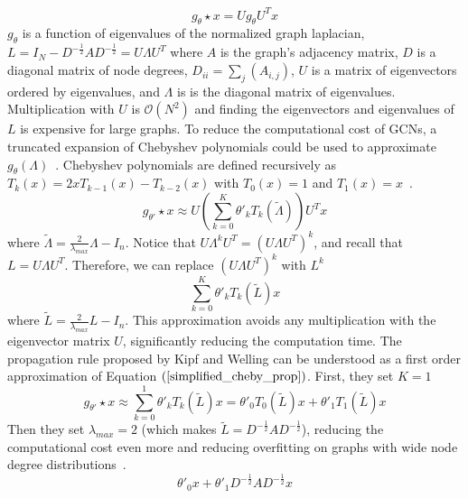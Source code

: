 \begin{equation}
\label{spectral_prop}
g_\theta \star x = Ug_\theta U^Tx
\end{equation}
$g_\theta$ is a function of eigenvalues of the normalized graph laplacian, $L = I_N - D^{-\frac{1}{2}}AD^{-\frac{1}{2}} = U\Lambda U^T$ where $A$ is the graph's adjacency matrix, $D$ is a diagonal matrix of node degrees, $D_{ii} = \sum_{j} (A_{i,j})$, $U$ is a matrix of eigenvectors ordered by eigenvalues, and $\Lambda$ is is the diagonal matrix of eigenvalues. Multiplication with $U$ is $\mathcal{O}(N^2) $ and finding the eigenvectors and eigenvalues of $L$ is expensive for large graphs. To reduce
 the computational cost of GCNs, a truncated expansion of Chebyshev polynomials could be used to approximate $g_\theta (\Lambda)$~\cite{Defferrard2016}.
Chebyshev polynomials are defined recursively as $T_k(x) = 2xT_{k-1}(x) - T_{k-2}(x)$ with $T_0(x) = 1$ and $T_1(x) = x$~\cite{Hammond2011}.
\begin{equation}
\label{cheby_prop}
g_{\theta'} \star x \approx U(\sum\limits_{k=0}^{K}\theta'_k T_k (\tilde{\Lambda}))U^Tx
\end{equation}
where $\tilde{\Lambda} = \frac{2}{\lambda_{max}} \Lambda - I_n$. Notice that $U \Lambda^k U^T = (U \Lambda U^T)^k$, and recall that $L = U\Lambda U^T$. Therefore, we can replace $(U \Lambda U^T)^k$ with $L^k$
\begin{equation}
\label{simplified_cheby_prop}
\sum\limits_{k=0}^{K} \theta'_k T_k (\tilde{L})x
\end{equation}
where  $\tilde{L} = \frac{2}{\lambda_{max}} L - I_n$. This approximation avoids any multiplication with the eigenvector matrix $U$, significantly reducing the computation time. The propagation rule proposed by Kipf and Welling can be understood as a first order approximation of Equation $(\ref{simplified_cheby_prop})$. First, they set $K = 1$
\begin{equation}
\label{firstorder_cheby}
g_{\theta'} \star x \approx \sum\limits_{k=0}^{1} \theta'_k T_k (\tilde{L})x = \theta'_0 T_0 (\tilde{L})x + \theta'_1 T_1 (\tilde{L})x
\end{equation}
Then they set $\lambda_{max} = 2$ (which makes $\tilde{L} = D^{-\frac{1}{2}}AD^{-\frac{1}{2}}$), reducing the computational cost even more and reducing overfitting on graphs with wide node degree distributions~\cite{Kipf2016}.
\begin{equation}
\label{two_params}
\theta'_0x + \theta'_1 D^{-\frac{1}{2}}AD^{-\frac{1}{2}}x 
\end{equation}
